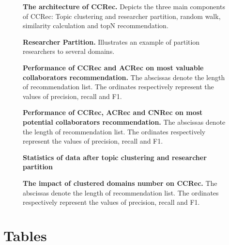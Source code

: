 \documentclass[10pt]{article}
\begin{document}
\begin{figure}[!hbt]
\caption{{\bf The architecture of CCRec.} Depicts the three main components of CCRec: Topic clustering and researcher partition, random walk, similarity calculation and topN recommendation.}
\label{Fig. 1}
\end{figure}

\begin{figure}[!hbt]
\caption{{\bf Researcher Partition.} Illustrates an example of partition researchers to several domains.}
\label{Fig. 2}
\end{figure}

\begin{figure}[!hbt]
\caption{{\bf Performance of CCRec and ACRec on most valuable collaborators recommendation.} The abscissas denote the length of recommendation list. The ordinates respectively represent the values of precision, recall and F1.}
\label{Fig. 3}
\end{figure}

\begin{figure}[!hbt]
\caption{{\bf Performance of CCRec, ACRec and CNRec on most potential collaborators recommendation.} The abscissas denote the length of recommendation list. The ordinates respectively represent the values of precision, recall and F1.}
\label{Fig. 4}
\end{figure}

\begin{figure}[!hbt]
\caption{{\bf Statistics of data after topic clustering and researcher partition}}
\label{Fig. 5}
\end{figure}

\begin{figure}[!hbt]
\caption{{\bf The impact of clustered domains number on CCRec.} The abscissas denote the length of recommendation list. The ordinates respectively represent the values of precision, recall and F1.}
\label{Fig. 6}
\end{figure}

\section*{Tables}
%
%
%
\end{document}
